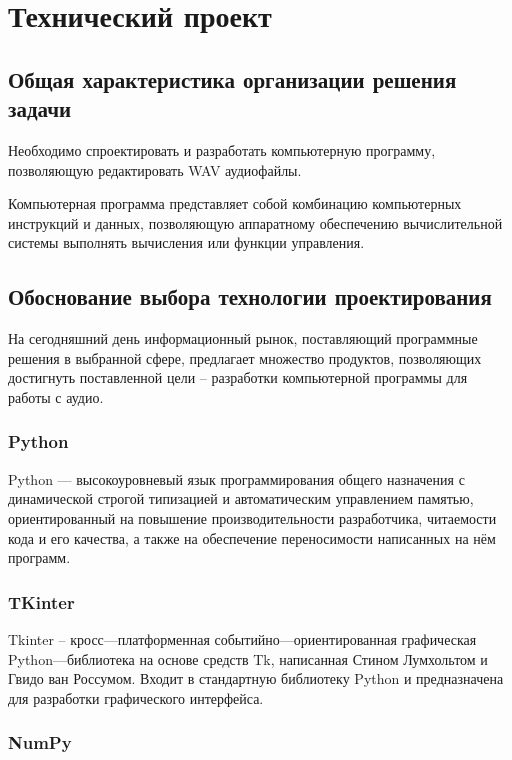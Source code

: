 \section{Технический проект}
\subsection{Общая характеристика организации решения задачи}

Необходимо спроектировать и разработать компьютерную программу, позволяющую редактировать WAV аудиофайлы.

Компьютерная программа представляет собой комбинацию компьютерных инструкций и данных, позволяющую аппаратному обеспечению вычислительной системы выполнять вычисления или функции управления.

\subsection{Обоснование выбора технологии проектирования}

На сегодняшний день информационный рынок, поставляющий программные решения в выбранной сфере, предлагает множество продуктов, позволяющих достигнуть поставленной цели – разработки компьютерной программы для работы с аудио.

\subsubsection{Python}

Python — высокоуровневый язык программирования общего назначения с динамической строгой типизацией и автоматическим управлением памятью, ориентированный на повышение производительности разработчика, читаемости кода и его качества, а также на обеспечение переносимости написанных на нём программ.

\subsubsection{TKinter}

Tkinter --  кросс—платформенная событийно—ориентированная графическая Python—библиотека на основе средств Tk, написанная Стином Лумхольтом и Гвидо ван Россумом. Входит в стандартную библиотеку Python и предназначена для разработки графического интерфейса.

\subsubsection{NumPy}

